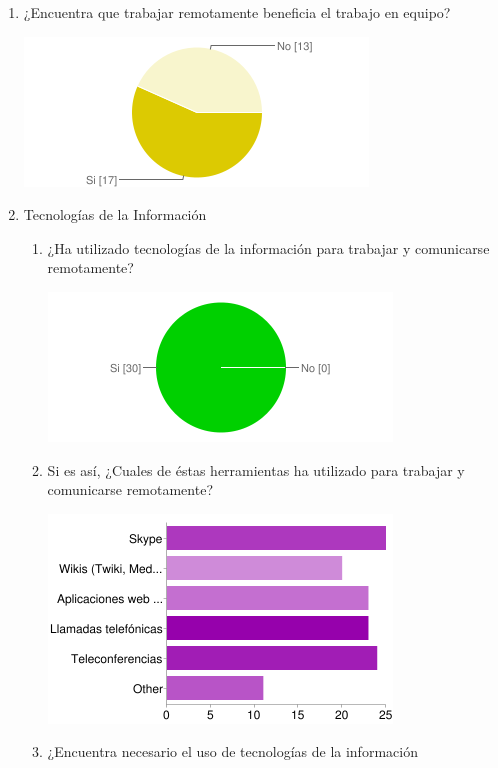 \begin{enumerate}
\begin{center}
    \end{center}
    \item ¿Encuentra que trabajar remotamente beneficia el trabajo en
        equipo?\\
    \begin{center}
	\includegraphics[scale=0.7]{images/fig4}
    \end{center}
    \item Tecnologías de la Información
    \begin{enumerate}
        \item ¿Ha utilizado tecnologías de la información para trabajar y
        comunicarse remotamente?
    \begin{center}
	\includegraphics[scale=0.7]{images/fig5}
    \end{center}
        \item Si es así, ¿Cuales de éstas herramientas ha utilizado para trabajar y
            comunicarse remotamente?\\
    \begin{center}
	\includegraphics[scale=0.7]{images/fig6}
    \end{center}
        \item ¿Encuentra necesario el uso de tecnologías de la información

\end{enumerate}
\end{enumerate}

